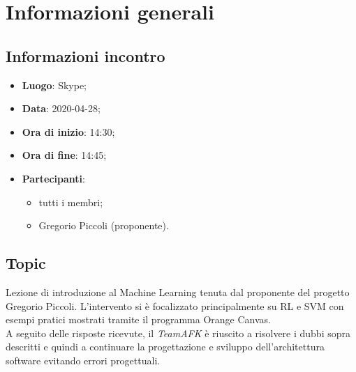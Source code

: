 \section{Informazioni generali}
\subsection{Informazioni incontro}
\begin{itemize}
\item \textbf{Luogo}: Skype;
\item \textbf{Data}: 2020-04-28;
\item \textbf{Ora di inizio}: 14:30;
\item \textbf{Ora di fine}: 14:45;
\item \textbf{Partecipanti}:
	\begin{itemize}
		\item tutti i membri;
		\item Gregorio Piccoli (proponente).
	\end{itemize}
\end{itemize}

\subsection{Topic}
Lezione di introduzione al Machine Learning tenuta dal proponente del progetto Gregorio Piccoli. L'intervento si è focalizzato principalmente su RL e SVM con esempi pratici mostrati tramite il programma Orange Canvas.\\

A seguito delle risposte ricevute, il \textit{TeamAFK} è riuscito a risolvere i dubbi sopra descritti e quindi a continuare la progettazione e sviluppo dell'architettura software evitando errori progettuali.